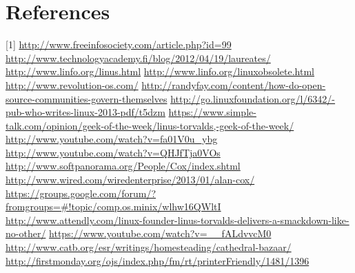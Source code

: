 \documentclass[11pt]{article}
\begin{document}
\pagebreak

\section{References}
[1] \url{http://www.freeinfosociety.com/article.php?id=99}
\newline
[2] \url{http://www.technologyacademy.fi/blog/2012/04/19/laureates/}
\newline
[3] \url{http://www.linfo.org/linus.html}
\newline
[4] \url{http://www.linfo.org/linuxobsolete.html}
\newline
[5] \url{http://www.revolution-os.com/}
\newline
[6] \url{http://randyfay.com/content/how-do-open-source-communities-govern-themselves}
\newline
[7] \url{http://go.linuxfoundation.org/l/6342/-pub-who-writes-linux-2013-pdf/t5dzm}
\newline
[8] \url{https://www.simple-talk.com/opinion/geek-of-the-week/linus-torvalds,-geek-of-the-week/}
\newline
[9.a] \url{http://www.youtube.com/watch?v=fa01V0u_ybg}
\newline
[9.b] \url{http://www.youtube.com/watch?v=QHJfTja0VOs}
\newline
[10] \url{http://www.softpanorama.org/People/Cox/index.shtml}
\newline
[11] \url{http://www.wired.com/wiredenterprise/2013/01/alan-cox/}
\newline
[12] \url{https://groups.google.com/forum/?fromgroups=#!topic/comp.os.minix/wlhw16QWltI}
\newline
[13] \url{http://www.attendly.com/linux-founder-linus-torvalds-delivers-a-smackdown-like-no-other/}
\newline
[14] \url{https://www.youtube.com/watch?v=__fALdvvcM0}
\newline
[15] \url{http://www.catb.org/esr/writings/homesteading/cathedral-bazaar/}
\newline
[16] \url{http://firstmonday.org/ojs/index.php/fm/rt/printerFriendly/1481/1396}
\end{document}
